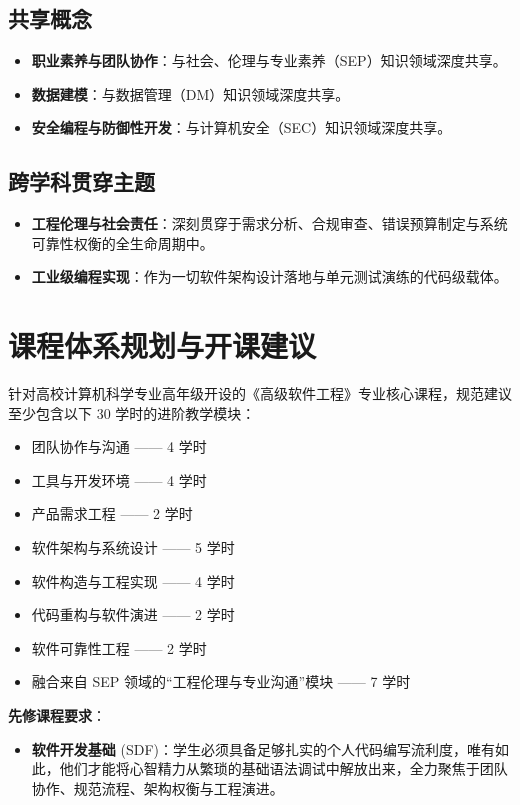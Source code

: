 \subsection{共享概念}
\begin{itemize}
    \item \textbf{职业素养与团队协作}：与社会、伦理与专业素养（SEP）知识领域深度共享。
    \item \textbf{数据建模}：与数据管理（DM）知识领域深度共享。
    \item \textbf{安全编程与防御性开发}：与计算机安全（SEC）知识领域深度共享。
\end{itemize}

\subsection{跨学科贯穿主题}
\begin{itemize}
    \item \textbf{工程伦理与社会责任}：深刻贯穿于需求分析、合规审查、错误预算制定与系统可靠性权衡的全生命周期中。
    \item \textbf{工业级编程实现}：作为一切软件架构设计落地与单元测试演练的代码级载体。
\end{itemize}

\section{课程体系规划与开课建议}

针对高校计算机科学专业高年级开设的《高级软件工程》专业核心课程，规范建议至少包含以下 30 学时的进阶教学模块：
\begin{itemize}
    \item 团队协作与沟通 —— 4 学时
    \item 工具与开发环境 —— 4 学时
    \item 产品需求工程 —— 2 学时
    \item 软件架构与系统设计 —— 5 学时
    \item 软件构造与工程实现 —— 4 学时
    \item 代码重构与软件演进 —— 2 学时
    \item 软件可靠性工程 —— 2 学时
    \item 融合来自 SEP 领域的“工程伦理与专业沟通”模块 —— 7 学时
\end{itemize}

\textbf{先修课程要求}：
\begin{itemize}
    \item \textbf{软件开发基础} (SDF)：学生必须具备足够扎实的个人代码编写流利度，唯有如此，他们才能将心智精力从繁琐的基础语法调试中解放出来，全力聚焦于团队协作、规范流程、架构权衡与工程演进。
\end{itemize}

